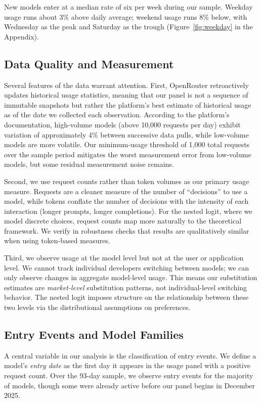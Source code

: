 \documentclass[11pt, a4paper]{article}
\begin{document}
New models enter at a median rate of six per week during our sample. Weekday usage runs about 3\% above daily average; weekend usage runs 8\% below, with Wednesday as the peak and Saturday as the trough (Figure~\ref{fig:weekday} in the Appendix).

\subsection{Data Quality and Measurement}

Several features of the data warrant attention. First, OpenRouter retroactively updates historical usage statistics, meaning that our panel is not a sequence of immutable snapshots but rather the platform's best estimate of historical usage as of the date we collected each observation. According to the platform's documentation, high-volume models (above 10,000 requests per day) exhibit variation of approximately 4\% between successive data pulls, while low-volume models are more volatile. Our minimum-usage threshold of 1,000 total requests over the sample period mitigates the worst measurement error from low-volume models, but some residual measurement noise remains.

Second, we use request counts rather than token volumes as our primary usage measure. Requests are a cleaner measure of the number of ``decisions'' to use a model, while tokens conflate the number of decisions with the intensity of each interaction (longer prompts, longer completions). For the nested logit, where we model discrete choices, request counts map more naturally to the theoretical framework. We verify in robustness checks that results are qualitatively similar when using token-based measures.

Third, we observe usage at the model level but not at the user or application level. We cannot track individual developers switching between models; we can only observe changes in aggregate model-level usage. This means our substitution estimates are \emph{market-level} substitution patterns, not individual-level switching behavior. The nested logit imposes structure on the relationship between these two levels via the distributional assumptions on preferences.

\subsection{Entry Events and Model Families}

A central variable in our analysis is the classification of entry events. We define a model's \emph{entry date} as the first day it appears in the usage panel with a positive request count. Over the 93-day sample, we observe entry events for the majority of models, though some were already active before our panel begins in December 2025.
\end{document}
